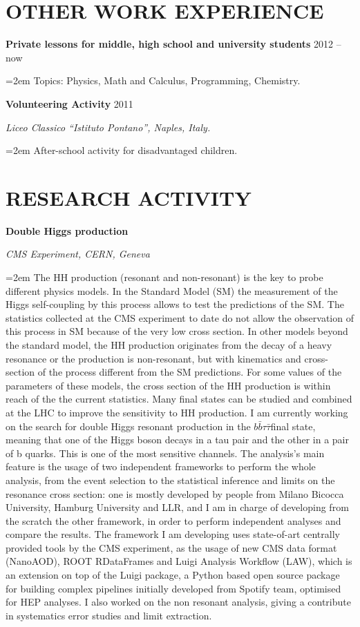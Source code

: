 \documentclass[paper=a4,fontsize=12pt]{article} %
\newcommand{\openquote}{``}
\newcommand{\closequote}{''}
\newcommand{\bbtt}{$ b\bar{b}\tau\bar{\tau}$}
\newcommand{\sepspace}{\vspace*{1em}}		%
\newcommand{\NewPart}[1]{\section*{\uppercase{#1}}}
\newcommand{\EducationEntry}[4]{
	\noindent \textbf{#1} \hfill      %
	{#2} \par  %
	\noindent \textit{#3} \par        %
	\noindent\hangindent=2em\hangafter=0 \small #4 %
	\normalsize \par}
\begin{document}
    \NewPart{Other Work experience}
	\EducationEntry{Private lessons for middle, high school and university students}{2012 -- now}{}{
		Topics: Physics, Math and Calculus, Programming, Chemistry. }
	\sepspace
	\EducationEntry{Volunteering Activity}{2011}{Liceo Classico \openquote Istituto Pontano\closequote, Naples, Italy.}{After-school activity for disadvantaged children. } 
	\sepspace
    \NewPart{Research activity}
    \EducationEntry{Double Higgs production}{}{CMS Experiment, CERN, Geneva}{The HH production (resonant and non-resonant) is the key to probe different physics models. In the Standard Model (SM) the measurement of the Higgs self-coupling by this process allows to test the predictions of the SM. The statistics collected at the CMS experiment to date do not allow the observation of this process in SM because of the very low cross section. In other models beyond the standard model, the HH production originates from the decay of a heavy resonance or the production is non-resonant, but with kinematics and cross-section of the process different from the SM  predictions. For some values of the parameters of these models, the cross section of the HH  production is within reach of the the current statistics. Many final states can be studied and combined at the LHC to improve the sensitivity to HH production. I am currently working on the search for double Higgs resonant production in the \bbtt final state, meaning that one of the Higgs boson decays in a tau pair and the other in a pair of b quarks. This is one of the most sensitive channels. The analysis's main feature is the usage of two independent frameworks to perform the whole analysis, from the event selection to the statistical inference and limits on the resonance cross section: one is mostly developed by people from Milano Bicocca University, Hamburg University and LLR, and I am in charge of developing from the scratch the other framework, in order to perform independent analyses and compare the results. The framework I am developing uses state-of-art centrally provided tools by the CMS experiment, as the usage of new CMS data format (NanoAOD), ROOT RDataFrames and Luigi Analysis Workflow (LAW), which is an extension on top of the Luigi package, a Python based open source package for building complex pipelines initially developed from Spotify team, optimised for HEP analyses. I also worked on the non resonant analysis, giving a contribute in systematics error studies and limit extraction.}
    \sepspace
\end{document}
